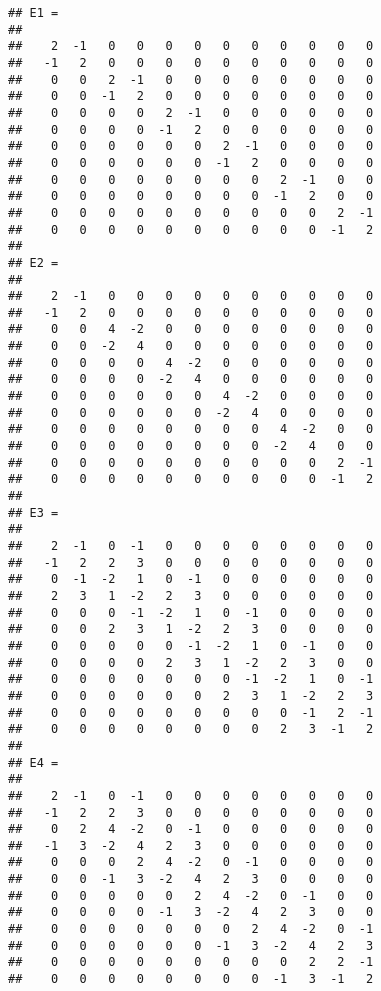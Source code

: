 \documentclass[a4paper]{article}
\begin{document}
\begin{verbatim}
## E1 =
## 
##    2  -1   0   0   0   0   0   0   0   0   0   0
##   -1   2   0   0   0   0   0   0   0   0   0   0
##    0   0   2  -1   0   0   0   0   0   0   0   0
##    0   0  -1   2   0   0   0   0   0   0   0   0
##    0   0   0   0   2  -1   0   0   0   0   0   0
##    0   0   0   0  -1   2   0   0   0   0   0   0
##    0   0   0   0   0   0   2  -1   0   0   0   0
##    0   0   0   0   0   0  -1   2   0   0   0   0
##    0   0   0   0   0   0   0   0   2  -1   0   0
##    0   0   0   0   0   0   0   0  -1   2   0   0
##    0   0   0   0   0   0   0   0   0   0   2  -1
##    0   0   0   0   0   0   0   0   0   0  -1   2
## 
## E2 =
## 
##    2  -1   0   0   0   0   0   0   0   0   0   0
##   -1   2   0   0   0   0   0   0   0   0   0   0
##    0   0   4  -2   0   0   0   0   0   0   0   0
##    0   0  -2   4   0   0   0   0   0   0   0   0
##    0   0   0   0   4  -2   0   0   0   0   0   0
##    0   0   0   0  -2   4   0   0   0   0   0   0
##    0   0   0   0   0   0   4  -2   0   0   0   0
##    0   0   0   0   0   0  -2   4   0   0   0   0
##    0   0   0   0   0   0   0   0   4  -2   0   0
##    0   0   0   0   0   0   0   0  -2   4   0   0
##    0   0   0   0   0   0   0   0   0   0   2  -1
##    0   0   0   0   0   0   0   0   0   0  -1   2
## 
## E3 =
## 
##    2  -1   0  -1   0   0   0   0   0   0   0   0
##   -1   2   2   3   0   0   0   0   0   0   0   0
##    0  -1  -2   1   0  -1   0   0   0   0   0   0
##    2   3   1  -2   2   3   0   0   0   0   0   0
##    0   0   0  -1  -2   1   0  -1   0   0   0   0
##    0   0   2   3   1  -2   2   3   0   0   0   0
##    0   0   0   0   0  -1  -2   1   0  -1   0   0
##    0   0   0   0   2   3   1  -2   2   3   0   0
##    0   0   0   0   0   0   0  -1  -2   1   0  -1
##    0   0   0   0   0   0   2   3   1  -2   2   3
##    0   0   0   0   0   0   0   0   0  -1   2  -1
##    0   0   0   0   0   0   0   0   2   3  -1   2
## 
## E4 =
## 
##    2  -1   0  -1   0   0   0   0   0   0   0   0
##   -1   2   2   3   0   0   0   0   0   0   0   0
##    0   2   4  -2   0  -1   0   0   0   0   0   0
##   -1   3  -2   4   2   3   0   0   0   0   0   0
##    0   0   0   2   4  -2   0  -1   0   0   0   0
##    0   0  -1   3  -2   4   2   3   0   0   0   0
##    0   0   0   0   0   2   4  -2   0  -1   0   0
##    0   0   0   0  -1   3  -2   4   2   3   0   0
##    0   0   0   0   0   0   0   2   4  -2   0  -1
##    0   0   0   0   0   0  -1   3  -2   4   2   3
##    0   0   0   0   0   0   0   0   0   2   2  -1
##    0   0   0   0   0   0   0   0  -1   3  -1   2

\end{verbatim}
\end{document}
